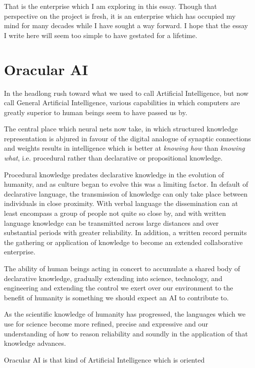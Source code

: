 \documentclass[10pt,titlepage]{book}
\begin{document}
That is the enterprise which I am exploring in this essay.
Though that perspective on the project is fresh, it is an enterprise which has occupied my mind for many decades while I have sought a way forward.
I hope that the essay I write here will seem too simple to have gestated for a lifetime.

\section{Oracular AI}

In the headlong rush toward what we used to call Artificial Intelligence, but now call General Artificial Intelligence, various capabilities in which computers are greatly superior to human beings seem to have passed us by.

The central place which neural nets now take, in which structured knowledge representation is abjured in favour of the digital analogue of synaptic connections and weights results in intelligence which is better at \emph{knowing how} than \emph{knowing what}, i.e. procedural rather than declarative or propositional knowledge.

Procedural knowledge predates declarative knowledge in the evolution of humanity, and as culture began to evolve this was a limiting factor.
In default of declarative language, the transmission of knowledge can only take place between individuals in close proximity.
With verbal language the dissemination can at least encompass a group of people not quite so close by, and with written language knowledge can be transmitted across large distances and over substantial periods with greater reliability.
In addition, a written record permits the gathering or application of knowledge to become an extended collaborative enterprise.

The ability of human beings acting in concert to accumulate a shared body of declarative knowledge, gradually extending into science, technology, and engineering and extending the control we exert over our environment to the benefit of humanity is something we should expect an AI to contribute to.

As the scientific knowledge of humanity has progressed, the languages which we use for science become more refined, precise and expressive and our understanding of how to reason reliability and soundly in the application of that knowledge advances.






Oracular AI is that kind of Artificial Intelligence which is oriented 
\end{document}
